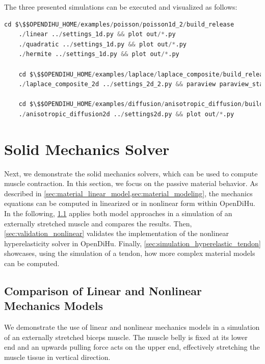\begin{reproduce_no_break}
  The three presented simulations can be executed and visualized as follows:
  \begin{lstlisting}[columns=fullflexible,breaklines=true,postbreak=\mbox{\textcolor{gray}{$\hookrightarrow$}\space},language=python]
    cd $\$$OPENDIHU_HOME/examples/poisson/poisson1d_2/build_release
    ./linear ../settings_1d.py && plot out/*.py
    ./quadratic ../settings_1d.py && plot out/*.py
    ./hermite ../settings_1d.py && plot out/*.py

    cd $\$$OPENDIHU_HOME/examples/laplace/laplace_composite/build_release/
    ./laplace_composite_2d ../settings_2d_2.py && paraview paraview_state.pvsm

    cd $\$$OPENDIHU_HOME/examples/diffusion/anisotropic_diffusion/build_release
    ./anisotropic_diffusion2d ../settings2d.py && plot out/*.py
  \end{lstlisting}
\end{reproduce_no_break}

\section{Solid Mechanics Solver}

Next, we demonstrate the solid mechanics solvers, which can be used to compute muscle contraction. In this section, we focus on the passive material behavior.
As described in \cref{sec:material_linear_model,sec:material_modeling}, the mechanics equations can be computed in linearized or in nonlinear form within OpenDiHu.
In the following, \cref{sec:comparison_linear_nonlinear} applies both model approaches in a simulation of an externally stretched muscle and compares the results. Then, \cref{sec:validation_nonlinear} validates the implementation of the nonlinear hyperelasticity solver in OpenDiHu. Finally, \cref{sec:simulation_hyperelastic_tendon} showcases, using the simulation of a tendon, how more complex material models can be computed.

\subsection{Comparison of Linear and Nonlinear Mechanics Models}\label{sec:comparison_linear_nonlinear}

We demonstrate the use of linear and nonlinear mechanics models in a simulation of an externally stretched biceps muscle. The muscle belly is fixed at its lower end and an upwards pulling force acts on the upper end, effectively stretching the muscle tissue in vertical direction.


